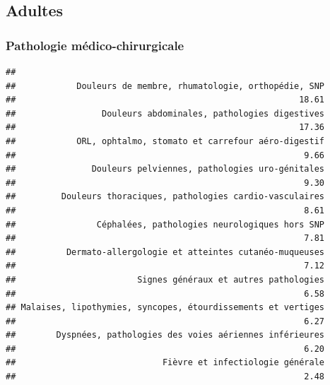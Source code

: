\documentclass[]{article}
\newenvironment{Shaded}{\begin{snugshade}}{\end{snugshade}}
\newcommand{\KeywordTok}[1]{\textcolor[rgb]{0.13,0.29,0.53}{\textbf{{#1}}}}
\newcommand{\DataTypeTok}[1]{\textcolor[rgb]{0.13,0.29,0.53}{{#1}}}
\newcommand{\DecValTok}[1]{\textcolor[rgb]{0.00,0.00,0.81}{{#1}}}
\newcommand{\StringTok}[1]{\textcolor[rgb]{0.31,0.60,0.02}{{#1}}}
\newcommand{\OtherTok}[1]{\textcolor[rgb]{0.56,0.35,0.01}{{#1}}}
\newcommand{\NormalTok}[1]{{#1}}
\begin{document}
\subsection{Adultes}\label{adultes}

\subsubsection{Pathologie
médico-chirurgicale}\label{pathologie-medico-chirurgicale}

\begin{Shaded}
\end{Shaded}

\begin{verbatim}
## 
##            Douleurs de membre, rhumatologie, orthopédie, SNP 
##                                                        18.61 
##                 Douleurs abdominales, pathologies digestives 
##                                                        17.36 
##            ORL, ophtalmo, stomato et carrefour aéro-digestif 
##                                                         9.66 
##               Douleurs pelviennes, pathologies uro-génitales 
##                                                         9.30 
##         Douleurs thoraciques, pathologies cardio-vasculaires 
##                                                         8.61 
##                Céphalées, pathologies neurologiques hors SNP 
##                                                         7.81 
##          Dermato-allergologie et atteintes cutanéo-muqueuses 
##                                                         7.12 
##                        Signes généraux et autres pathologies 
##                                                         6.58 
## Malaises, lipothymies, syncopes, étourdissements et vertiges 
##                                                         6.27 
##        Dyspnées, pathologies des voies aériennes inférieures 
##                                                         6.20 
##                             Fièvre et infectiologie générale 
##                                                         2.48
\end{verbatim}
\end{document}
